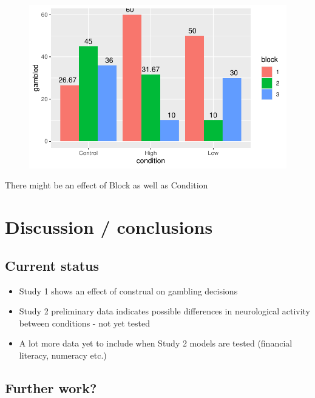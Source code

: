 \documentclass[
  letterpaper,
  DIV=11,
  numbers=noendperiod]{scrartcl}
\begin{document}
\begin{figure}[H]

{\centering \includegraphics{index_files/figure-pdf/unnamed-chunk-12-1.pdf}

}

\end{figure}

There might be an effect of Block as well as Condition

\hypertarget{discussion-conclusions}{%
\section{Discussion / conclusions}\label{discussion-conclusions}}

\hypertarget{current-status}{%
\subsection{Current status}\label{current-status}}

\begin{itemize}
\item
  Study 1 shows an effect of construal on gambling decisions
\item
  Study 2 preliminary data indicates possible differences in
  neurological activity between conditions - not yet tested
\item
  A lot more data yet to include when Study 2 models are tested
  (financial literacy, numeracy etc.)
\end{itemize}

\hypertarget{further-work}{%
\subsection{Further work?}\label{further-work}}
\end{document}
